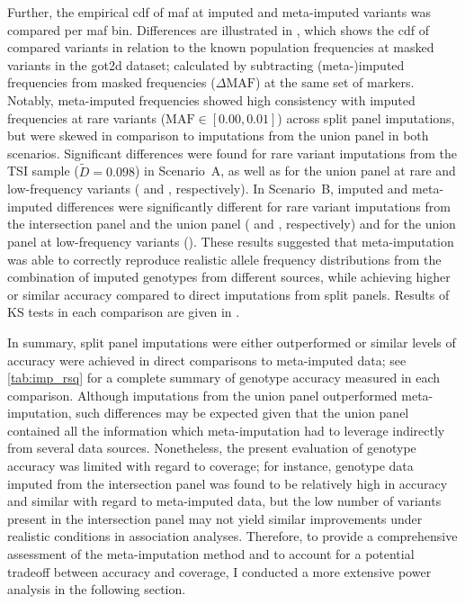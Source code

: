 Further, the empirical \gls{cdf} of \gls{maf} at imputed and meta-imputed variants was compared per \gls{maf} bin.
Differences are illustrated in , which shows the \gls{cdf} of compared variants in relation to the known population frequencies at masked variants in the \gls{got2d} dataset; calculated by subtracting (meta-)imputed frequencies from masked frequencies (${\Delta\text{MAF}}$) at the same set of markers.
Notably, meta-imputed frequencies showed high consistency with imputed frequencies at rare variants (${\text{MAF} \in \left[ 0.00, 0.01\right]}$) across split panel imputations, but were skewed in comparison to imputations from the union panel in both scenarios.
Significant differences were found for rare variant imputations from the TSI sample (${\widetilde{D}=0.098}$) in Scenario~A, as well as for the union panel at rare and low-frequency variants ( and , respectively).
In Scenario~B, imputed and meta-imputed differences were significantly different for rare variant imputations from the intersection panel and the union panel ( and , respectively) and for the union panel at low-frequency variants ().
These results suggested that meta-imputation was able to correctly reproduce realistic allele frequency distributions from the combination of imputed genotypes from different sources, while achieving higher or similar accuracy compared to direct imputations from split panels.
Results of KS tests in each comparison are given in .


In summary, split panel imputations were either outperformed or similar levels of accuracy were achieved in direct comparisons to meta-imputed data; see \cref{tab:imp_rsq} for a complete summary of genotype accuracy measured in each comparison.
Although imputations from the union panel outperformed meta-imputation, such differences may be expected given that the union panel contained all the information which meta-imputation had to leverage indirectly from several data sources.
Nonetheless, the present evaluation of genotype accuracy was limited with regard to coverage; for instance, genotype data imputed from the intersection panel was found to be relatively high in accuracy and similar with regard to meta-imputed data, but the low number of variants present in the intersection panel may not yield similar improvements under realistic conditions in association analyses.
Therefore, to provide a comprehensive assessment of the meta-imputation method and to account for a potential tradeoff between accuracy and coverage, I conducted a more extensive power analysis in the following section.



